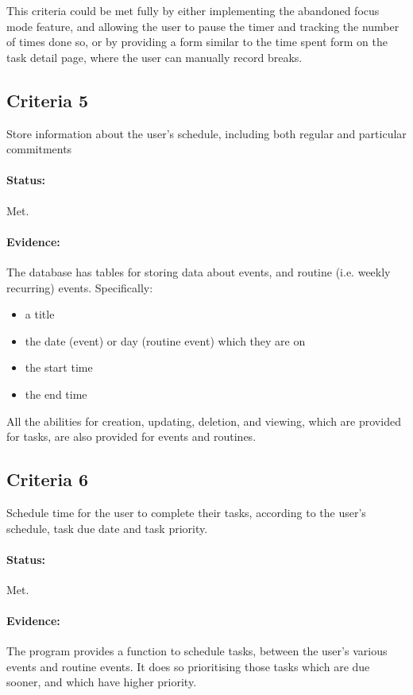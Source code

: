 \documentclass{article}
\begin{document}
This criteria could be met fully by either implementing the abandoned focus mode feature,
and allowing the user to pause the timer and tracking the number of times done so,
or by providing a form similar to the time spent form on the task detail page,
where the user can manually record breaks.

\subsection{Criteria 5}
Store information about the user's schedule,
including both regular and particular commitments

\paragraph{Status:}
Met.

\paragraph{Evidence:}
The database has tables for storing data about events,
and routine (i.e. weekly recurring) events.
Specifically:
\begin{itemize}
	\item a title
	\item the date (event) or day (routine event) which they are on
	\item the start time
	\item the end time
\end{itemize}

All the abilities for creation, updating, deletion, and viewing,
which are provided for tasks,
are also provided for events and routines.

\subsection{Criteria 6}
Schedule time for the user to complete their tasks, according to the
user's schedule, task due date and task priority.

\paragraph{Status:}
Met.

\paragraph{Evidence:}
The program provides a function to schedule tasks,
between the user's various events and routine events.
It does so prioritising those tasks which are due sooner,
and which have higher priority.
\end{document}
